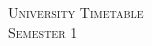 \documentclass[10pt, german]{article} %
\begin{document}
\pagestyle{empty} %

\setlength{\parindent}{0pt} %



\begin{center}
	\textsc{\LARGE University Timetable}\\ %
	\textsc{\large Semester 1} %
\end{center}

\end{document}
